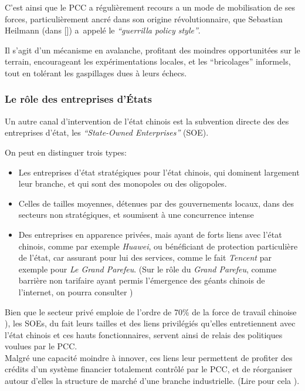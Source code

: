 \documentclass[a4paper]{article}
\begin{document}
 C’est ainsi que le PCC a régulièrement recours a un mode de mobilisation de ses
forces, particulièrement ancré dans son origine révolutionnaire, que Sebastian
Heilmann (dans [\cite{heilmann18_red}]) a appelé le \emph{“guerrilla policy style”}.

Il s’agit d’un mécanisme en avalanche, profitant des moindres opportunitées sur
le terrain, encourageant les expérimentations locales, et les “bricolages”
informels, tout en tolérant les gaspillages dues à leurs échecs.
\subsubsection{Le rôle des entreprises d’États}
\label{sec:org5c8608f}

Un autre canal d’intervention de l’état chinois est la subvention directe des
des entreprises d’état, les \emph{“State-Owned Enterprises”} (SOE).  

On peut en distinguer trois types:
\begin{itemize}
\item Les entreprises d’état stratégiques pour l’état chinois, qui dominent
largement leur branche, et qui sont des monopoles ou des oligopoles.
\item Celles de tailles moyennes, détenues par des gouvernements locaux, dans des
secteurs non stratégiques, et soumisent à une concurrence intense
\item Des entreprises en apparence privées, mais ayant de forts liens avec l’état
chinois, comme par exemple \emph{Huawei}, ou bénéficiant de protection particulière
de l’état, car assurant pour lui des services, comme le fait \emph{Tencent} par
exemple pour \emph{Le Grand Parefeu}. (Sur le rôle du \emph{Grand Parefeu}, comme
barrière non tarifaire ayant permis l’émergence des géants chinois de
l’internet, on pourra consulter \cite{griffiths19_china} )
\end{itemize}


Bien que le secteur privé emploie de l’ordre de 70\% de la force de travail
chinoise \cite{xiaolan15_chinas}), les SOEs, du fait leurs tailles et des liens
privilégiés qu’elles entretiennent avec l’état chinois et ces hauts
fonctionnaires, servent ainsi de relais des politiques voulues par le PCC.\\

Malgré une capacité moindre à innover, ces liens leur permettent de profiter des
crédits d’un système financier totalement contrôlé par le PCC, et de réorganiser
autour d’elles la structure de marché d’une branche industrielle. (Lire pour
cela \cite{naughton21_rise}).\\
\end{document}
